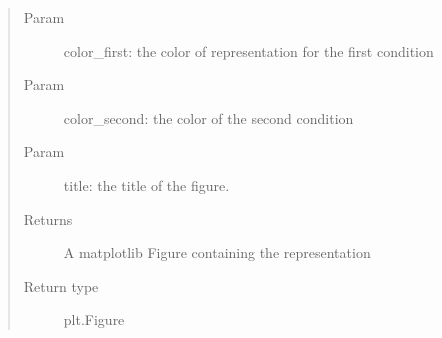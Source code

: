 \documentclass[letterpaper,10pt,english]{sphinxmanual}
\begin{document}
\begin{fulllineitems}
\begin{quote}
\begin{description}
\begin{itemize}
\end{itemize}

\item[{Param}] \leavevmode
color\_first: the color of representation for the first condition

\item[{Param}] \leavevmode
color\_second: the color of the second condition

\item[{Param}] \leavevmode
title: the title of the figure.

\item[{Returns}] \leavevmode
A matplotlib Figure containing the representation

\item[{Return type}] \leavevmode
plt.Figure

\end{description}\end{quote}

\end{fulllineitems}

\end{document}
